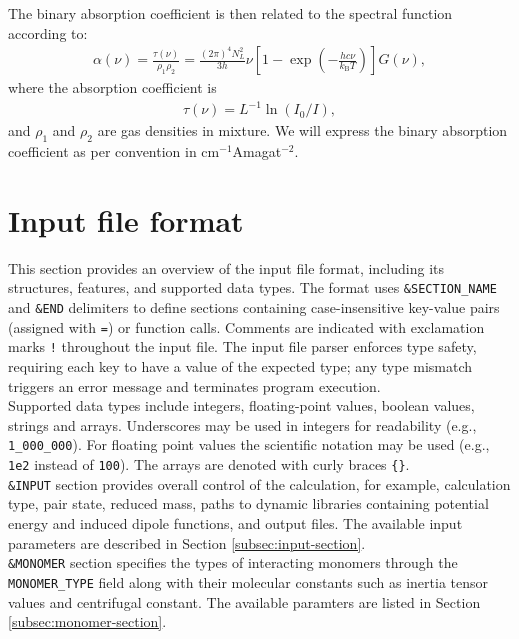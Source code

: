 \documentclass[color]{article}
\newcommand{\lb}{\left(}
\newcommand{\rb}{\right)}
\newcommand{\lsq}{\left[}
\newcommand{\rsq}{\right]}
\begin{document}
The binary absorption coefficient is then related to the spectral function according to:
\begin{gather}
    \alpha(\nu) = \frac{\tau(\nu)}{\rho_1 \rho_2} = \frac{(2\pi)^4 N_L^2}{3 h} \nu \lsq 1 - \exp \lb -\frac{h c \nu}{k_\text{B} T} \rb \rsq G(\nu),
\end{gather}
%
where the absorption coefficient is
\begin{gather}
    \tau(\nu) = L^{-1} \ln (I_0 / I),
\end{gather}
%
and $\rho_1$ and $\rho_2$ are gas densities in mixture. We will express the binary absorption coefficient as per convention in cm$^{-1}$Amagat$^{-2}$.

\section{Input file format}
\label{sec:input-file-format}

This section provides an overview of the input file format, including its structures, features, and supported data types.
The format uses \texttt{\&SECTION\_NAME} and \texttt{\&END} delimiters to define sections containing case-insensitive key-value pairs (assigned with \texttt{=}) or function calls. Comments are indicated with  exclamation marks \texttt{!} throughout the input file. The input file parser enforces type safety, requiring each key to have a value of the expected type; any type mismatch triggers an error message and terminates program execution. \\

\noindent
Supported data types include integers, floating-point values, boolean values, strings and arrays. Underscores may be used in integers for readability (e.g., \texttt{1\_000\_000}). For floating point values the scientific notation may be used (e.g., \texttt{1e2} instead of \texttt{100}). The arrays are denoted with curly braces \texttt{\{\}}.  
\\

\noindent
\texttt{\&INPUT} section provides overall control of the calculation, for example, calculation type, pair state, reduced mass, paths to dynamic libraries containing potential energy and induced dipole functions, and output files. The available input parameters are described in Section \ref{subsec:input-section}. \\  

\noindent
\texttt{\&MONOMER} section specifies the types of interacting monomers through the \texttt{MONOMER\_TYPE} field along with their molecular constants such as inertia tensor values and centrifugal constant. The available paramters are listed in Section \ref{subsec:monomer-section}. \\
\end{document}
